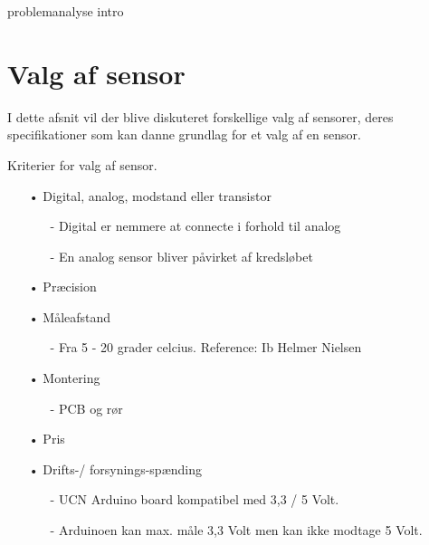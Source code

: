 problemanalyse intro

\section{Valg af sensor}
I dette afsnit vil der blive diskuteret forskellige valg af sensorer, deres specifikationer som kan danne grundlag for et valg af en sensor.

Kriterier for valg af sensor.
\begin{enumerate}
	\item[•]Digital, analog, modstand eller transistor
	    \begin{enumerate}
	        \item[-]Digital er nemmere at connecte i forhold til analog
	        \item[-]En analog sensor bliver påvirket af kredsløbet
	    \end{enumerate}	
	
	\item[•]Præcision 
	\item[•]Måleafstand
		\begin{enumerate}
			\item[-]Fra 5 - 20 grader celcius. Reference: Ib Helmer Nielsen
		\end{enumerate}	
	\item[•]Montering
	    \begin{enumerate}
	        \item[-]PCB og rør
	    \end{enumerate}
	\item[•]Pris
	\item[•]Drifts-/ forsynings-spænding 
	    \begin{enumerate}
	        \item[-]UCN Arduino board kompatibel med 3,3 / 5 Volt.
	        \item[-]Arduinoen kan max. måle 3,3 Volt men kan ikke modtage 5 Volt.
	    \end{enumerate}
	
\end{enumerate}

